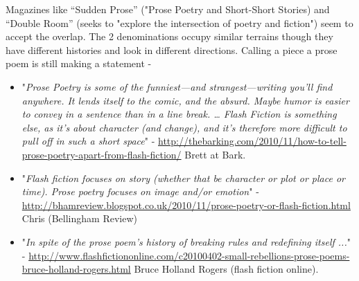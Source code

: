 \documentclass[11pt]{article}
\begin{document}
Magazines like ``Sudden Prose'' ("Prose Poetry and Short-Short Stories) and ``Double Room'' (seeks to "explore the intersection of poetry and fiction") seem to accept the overlap. The 2 denominations occupy similar terrains though they have different histories and look in different directions. Calling a piece a prose poem is still making a statement - 
\begin{itemize}
\item "\textit{Prose Poetry is some of the funniest—and strangest—writing you’ll find anywhere. It lends itself to the comic, and the absurd. Maybe humor is easier to convey in a sentence than in a line break. … Flash Fiction is something else, as it’s about character (and change), and it’s therefore more difficult to pull off in such a short space}" -  \url{http://thebarking.com/2010/11/how-to-tell-prose-poetry-apart-from-flash-fiction/} Brett at Bark.
\item "\textit{Flash fiction focuses on story (whether that be character or plot or place or time). Prose poetry focuses on image and/or emotion}" - \url{http://bhamreview.blogspot.co.uk/2010/11/prose-poetry-or-flash-fiction.html} Chris (Bellingham Review)
\item "\textit{In spite of the prose poem’s history of breaking rules and redefining itself ...}" - \url{http://www.flashfictiononline.com/c20100402-small-rebellions-prose-poems-bruce-holland-rogers.html} Bruce Holland Rogers (flash fiction online). 
\end{itemize}
\end{document}
